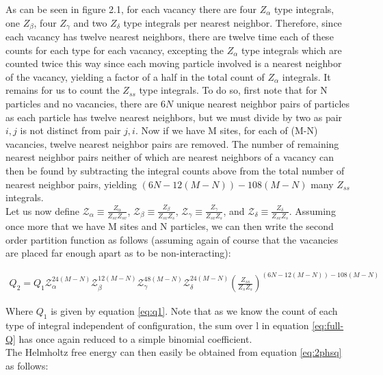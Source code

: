 \documentclass[paper=a4, fontsize=11pt]{scrartcl} %
\numberwithin{equation}{section} %
\numberwithin{figure}{section} %
\numberwithin{table}{section} %
\begin{document}
As can be seen in figure 2.1, for each vacancy there are four $Z_\alpha$ 
type integrals, one $Z_\beta$, four $Z_\gamma$ and two $Z_\delta$ type
integrals per nearest neighbor.  Therefore, since each vacancy has twelve
nearest neighbors, there are twelve time each of these counts for each type
for each vacancy, excepting the $Z_\alpha$ type integrals which are counted
twice this way since each moving particle involved is a nearest neighbor of
the vacancy, yielding a factor of a half in the total count of $Z_\alpha$
integrals.  It remains for us to count the $Z_{ss}$ type integrals.  To do so,
first note that for N particles and no vacancies, there are $6N$ unique nearest neighbor 
pairs of particles as each particle 
has twelve nearest neighbors, but we must divide by two as pair $i,j$ is not
distinct from pair $j,i$.  Now if we have M sites, for each of (M-N) vacancies, twelve nearest
neighbor pairs are removed.  The number of remaining nearest neighbor pairs neither
of which are nearest neighbors of a vacancy can then be found by subtracting
the integral counts above from the total number of nearest neighbor pairs,
yielding $(6N-12(M-N))-108(M-N)$ many $Z_{ss}$ integrals.\\

Let us now define $\mathscr{Z}_\alpha \equiv \frac{Z_\alpha}{Z_{sv}Z_{sv}}$,
$\mathscr{Z}_\beta \equiv \frac{Z_\beta}{Z_{sv}Z_s}$,
$\mathscr{Z}_\gamma \equiv \frac{Z_\gamma}{Z_{sv}Z_s}$, and
$\mathscr{Z}_\delta \equiv \frac{Z_\delta}{Z_{sv}Z_s}$.
Assuming once more that we have M sites and N particles, we 
can then write the second order partition function as follows
(assuming again of course that the vacancies are placed far enough apart
 as to be non-interacting):

\begin{align}
  \label{eq:2phsq}
  Q_2 = Q_1 \mathscr{Z}_\alpha^{24(M-N)}\mathscr{Z}_\beta^{12(M-N)}
            \mathscr{Z}_\gamma^{48(M-N)}\mathscr{Z}_\delta^{24(M-N)}
            \left(\frac{Z_{ss}}{Z_sZ_s}\right)^{(6N-12(M-N))-108(M-N)}
\end{align}

Where $Q_1$ is given by equation \ref{eq:q1}. Note that as we know the count
of each type of integral independent of configuration, the sum over l in 
equation \ref{eq:full-Q} has once again reduced to a simple binomial coefficient.\\

The Helmholtz free energy can then easily be obtained from equation
\ref{eq:2phsq} as follows:
\end{document}
